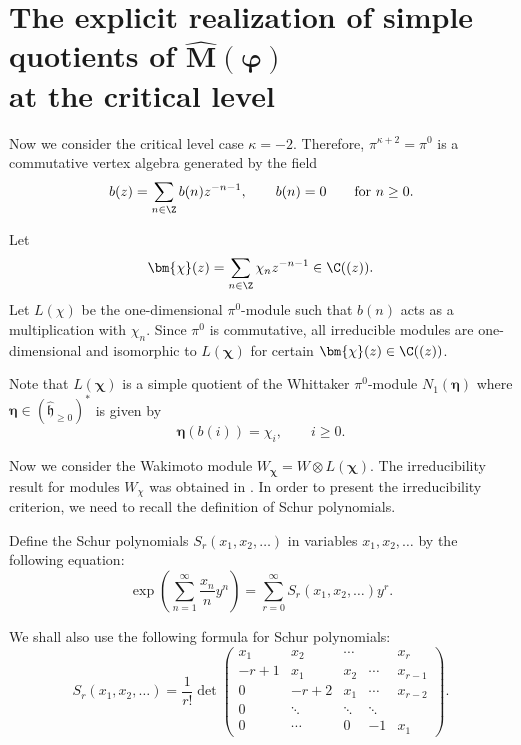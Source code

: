 \documentclass[10pt,a4paper]{amsart}
\numberwithin{equation}{section}
\theoremstyle{definition}
\newcommand{\1}{\textbf{1}}
\begin{document}
\section[The explicit realization of simple quotients of widehat M(varphi) at the critical level]{The explicit realization of simple quotients of $\boldsymbol{\widehat M(\varphi)}$\\ at the critical level}
\label{ired-critical-sl(2)}

Now we consider the critical level case $\kappa =-2$. Therefore, $\pi^{\kappa +2} = \pi^0 $ is a commutative vertex algebra generated by the field
 \[ b(z) = \sum_{n \in {\Z}} b(n) z^{-n-1}, \qquad b(n)=0 \qquad \mbox{for} \ n \ge 0. \]

Let \[ \bm{\chi}(z) = \sum_{n \in {\Z} } \chi_n z^{-n-1} \in {\C}((z)). \]
Let $L (\chi) $ be the one-dimensional $\pi^0$-module such that $b(n)$ acts as a multiplication with $\chi_n$. Since $\pi^0$ is commutative, all irreducible modules are one-dimensional and isomorphic to $L (\bm{\chi}) $ for certain $\bm{\chi}(z) \in {\C}((z))$.

Note that $L (\bm{\chi})$ is a simple quotient of the Whittaker $\pi^0$-module $N_1(\bm{\eta})$ where
$\bm{\eta} \in (\widehat{\mathfrak h}_{\ge 0}) ^* $ is given by
 \[ \bm{\eta}(b (i)) = \chi_i, \qquad i \ge 0. \]

Now we consider the Wakimoto module
$W_{\bm{\chi}} = W \otimes L (\bm{\chi})$.
The irreducibility result for modules $W_{\chi}$ was obtained in \cite{A-07, A-14}.
In order to present the irreducibility criterion, we need to
recall the definition of Schur polynomials.

 Define the Schur polynomials $S_{r}(x_{1},x_{2},\dots)$
 in variables $x_{1},x_{2},\dots$ by the following equation:
\begin{equation*}%
\exp\left(\sum_{n=1}^{\infty}\frac{x_n}{n}y^n\right)
=\sum_{r=0}^{\infty}S_r(x_1,x_2,\dots)y^r.
\end{equation*}

We shall also use the following formula for Schur polynomials:
\begin{equation*}%
S_r(x_1,x_2,\dots)=\frac{1}{r!}
\det\begin{pmatrix}
 x_1 & x_2 & \cdots & & x_r \\
 -r+1 & x_1 & x_2 & \cdots & x_{r-1} \\
 0 & -r+2 & x_1 & \cdots & x_{r-2} \\
 0 & \ddots & \ddots & \ddots & \\
 0 & \cdots & 0 & -1 & x_1
\end{pmatrix}.
\end{equation*}
\end{document}

